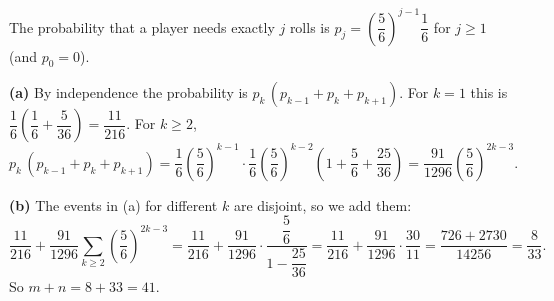 The probability that a player needs exactly $j$ rolls is $p_j=\left(\dfrac{5}{6}\right)^{j-1}\dfrac{1}{6}$ for $j\ge1$ (and $p_0=0$).

\textbf{(a)} By independence the probability is $p_k\,(p_{k-1}+p_k+p_{k+1})$.
For $k=1$ this is $\dfrac{1}{6}\left(\dfrac{1}{6}+\dfrac{5}{36}\right)=\dfrac{11}{216}$.
For $k\ge2$,
\[
p_k\,(p_{k-1}+p_k+p_{k+1})=\dfrac{1}{6}\left(\dfrac{5}{6}\right)^{k-1}\cdot\dfrac{1}{6}\left(\dfrac{5}{6}\right)^{k-2}\left(1+\dfrac{5}{6}+\dfrac{25}{36}\right)
=\dfrac{91}{1296}\left(\dfrac{5}{6}\right)^{2k-3}.
\]

\textbf{(b)} The events in (a) for different $k$ are disjoint, so we add them:
\[
\dfrac{11}{216}+\dfrac{91}{1296}\sum_{k\ge2}\left(\dfrac{5}{6}\right)^{2k-3}
=\dfrac{11}{216}+\dfrac{91}{1296}\cdot\dfrac{\dfrac{5}{6}}{1-\dfrac{25}{36}}
=\dfrac{11}{216}+\dfrac{91}{1296}\cdot\dfrac{30}{11}
=\dfrac{726+2730}{14256}=\dfrac{8}{33}.
\]
So $m+n=8+33=\boxed{41}$.
